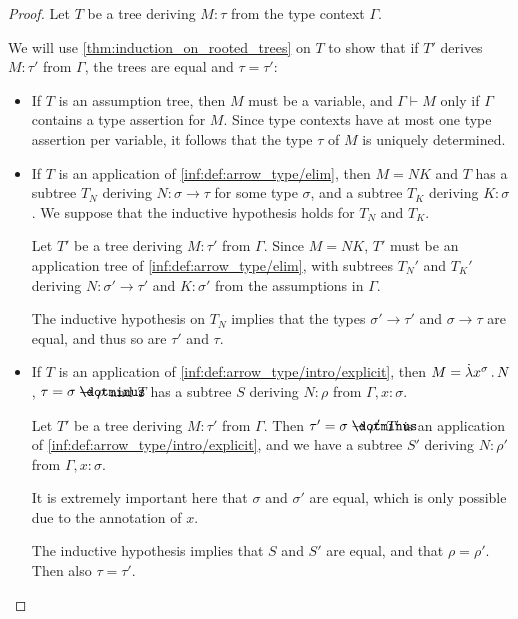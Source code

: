 \begin{proof}
  Let \( T \) be a tree deriving \( M: \tau \) from the type context \( \Gamma \).

  We will use \cref{thm:induction_on_rooted_trees} on \( T \) to show that if \( T' \) derives \( M: \tau' \) from \( \Gamma \), the trees are equal and \( \tau = \tau' \):
  \begin{itemize}
    \item If \( T \) is an assumption tree, then \( M \) must be a variable, and \( \Gamma \vdash M \) only if \( \Gamma \) contains a type assertion for \( M \). Since type contexts have at most one type assertion per variable, it follows that the type \( \tau \) of \( M \) is uniquely determined.

    \item If \( T \) is an application of \ref{inf:def:arrow_type/elim}, then \( M = NK \) and \( T \) has a subtree \( T_N \) deriving \( N: \sigma \to \tau \) for some type \( \sigma \), and a subtree \( T_K \) deriving \( K: \sigma \). We suppose that the inductive hypothesis holds for \( T_N \) and \( T_K \).

    Let \( T' \) be a tree deriving \( M: \tau' \) from \( \Gamma \). Since \( M = NK \), \( T' \) must be an application tree of \ref{inf:def:arrow_type/elim}, with subtrees \( T_N' \) and \( T_K' \) deriving \( N: \sigma' \to \tau' \) and \( K: \sigma' \) from the assumptions in \( \Gamma \).

    The inductive hypothesis on \( T_N \) implies that the types \( \sigma' \to \tau' \) and \( \sigma \to \tau \) are equal, and thus so are \( \tau' \) and \( \tau \).

    \item If \( T \) is an application of \ref{inf:def:arrow_type/intro/explicit}, then \( M = \qabs {x^\sigma} N \), \( \tau = \sigma \synimplies \rho \) and \( T \) has a subtree \( S \) deriving \( N: \rho \) from \( \Gamma, x: \sigma \).

    Let \( T' \) be a tree deriving \( M: \tau' \) from \( \Gamma \). Then \( \tau' = \sigma \synimplies \rho' \) \( T' \) is an application of \ref{inf:def:arrow_type/intro/explicit}, and we have a subtree \( S' \) deriving \( N: \rho' \) from \( \Gamma, x: \sigma \).

    It is extremely important here that \( \sigma \) and \( \sigma' \) are equal, which is only possible due to the annotation of \( x \).

    The inductive hypothesis implies that \( S \) and \( S' \) are equal, and that \( \rho = \rho' \). Then also \( \tau = \tau' \).
  \end{itemize}
\end{proof}

